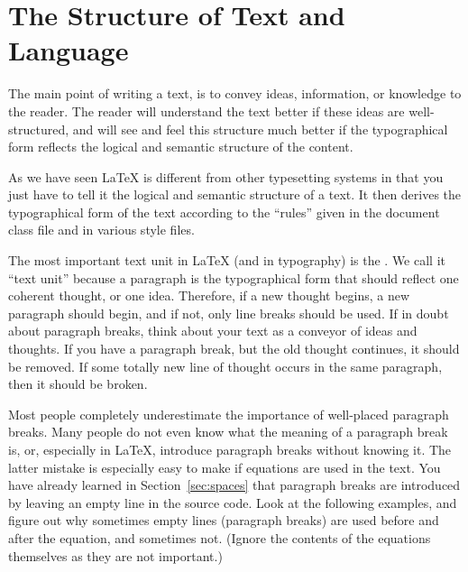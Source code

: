 \section{The Structure of Text and Language}
The main point of writing a text, is to convey ideas, information, or
knowledge to the reader.  The reader will understand the text better
if these ideas are well-structured, and will see and feel this
structure much better if the typographical form reflects the logical
and semantic structure of the content.

As we have seen \LaTeX{} is different from other typesetting systems in that
you just have to tell it the logical and semantic structure of a text.  It then
derives the typographical form of the text according to the \enquote{rules}
given in the document class file and in various style files.

The most important text unit in \LaTeX{} (and in typography) is the
.  We call it \enquote{text unit} because a paragraph is the
typographical form that should reflect one coherent thought, or one idea.
Therefore, if a new thought begins, a new paragraph should begin, and if not,
only line breaks should be used.  If in doubt about paragraph breaks, think
about your text as a conveyor of ideas and thoughts.  If you have a paragraph
break, but the old thought continues, it should be removed.  If some totally
new line of thought occurs in the same paragraph, then it should be broken.

Most people completely underestimate the importance of well-placed paragraph
breaks. Many people do not even know what the meaning of a paragraph break is,
or, especially in \LaTeX, introduce paragraph breaks without knowing it.  The
latter mistake is especially easy to make if equations are used in the text.
You have already learned in Section~\ref{sec:spaces} that paragraph breaks are
introduced by leaving an empty line in the source code. Look at the following
examples, and figure out why sometimes empty lines (paragraph breaks) are used
before and after the equation, and sometimes not. (Ignore the contents of the
equations themselves as they are not important.)

